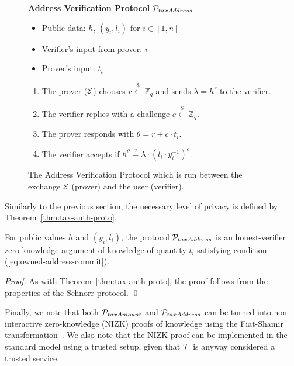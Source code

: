 \begin{figure}[h]
\begin{mdframed}

\begin{center}
    \textbf{Address Verification Protocol} $\mathcal{P}_{taxAddress}$
\end{center}

    \begin{itemize}
        \item Public data: $h$, $(y_i, l_i)$ for $i \in [1, n]$
        \item Verifier's input from prover: $i$
        \item Prover's input: $t_i$
    \end{itemize}

    \begin{enumerate}
        \item The prover ($\mathcal{E}$) chooses $r \xleftarrow{\$} \mathbb{Z}_q$
            and sends $\lambda = h^r$ to the verifier.
        \item The verifier replies with a challenge $c \xleftarrow{\$} \mathbb{Z}_q$.
        \item The prover responds with $\theta = r + c \cdot t_i$.
        \item The verifier accepts if $h^\theta \stackrel{?}{=} \lambda \cdot (l_i \cdot y_i^{-1})^c$.
    \end{enumerate}

\end{mdframed}
\caption{
    The Address Verification Protocol which is run between the exchange $\mathcal{E}$
    (prover) and the user (verifier).
}
\label{fig:taxation_verification_proto}
\end{figure}

Similarly to the previous section, the necessary level of privacy is defined by
Theorem~\ref{thm:tax-auth-proto}.

\begin{theorem}
    For public values $h$ and $(y_i, l_i)$, the protocol
    $\mathcal{P}_{taxAddress}$ is an honest-verifier zero-knowledge argument of
    knowledge of quantity $t_i$ satisfying condition (\ref{eq:owned-address-commit}).
\end{theorem}
\begin{proof}
    As with Theorem~\ref{thm:tax-auth-proto}, the proof follows from the
    properties of the Schnorr protocol. \qed
\end{proof}

Finally, we note that both $\mathcal{P}_{taxAmount}$ and $\mathcal{P}_{taxAddress}$ can be
turned into non-interactive zero-knowledge (NIZK) proofs of knowledge using the
Fiat-Shamir transformation~\cite{C:FiaSha86}. We also note that the NIZK proof
can be implemented in the standard model using a trusted setup, given that
$\mathcal{T}$ is anyway considered a trusted service.
